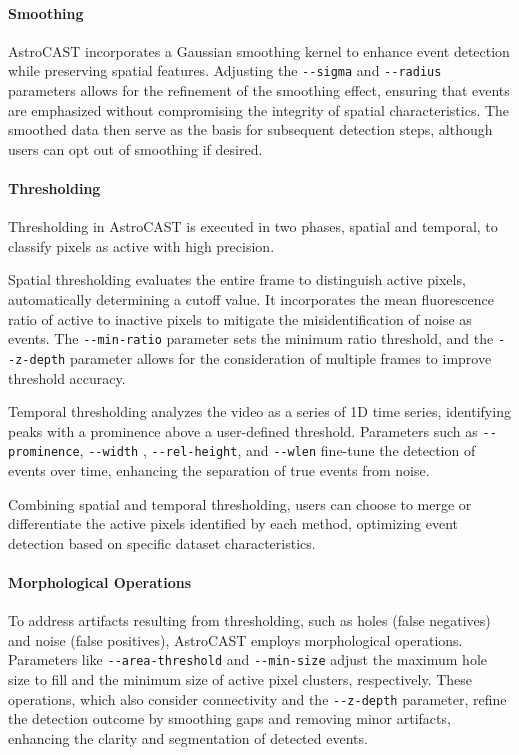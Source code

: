 \paragraph{Smoothing}
AstroCAST incorporates a Gaussian smoothing kernel to enhance event detection while preserving spatial features.
Adjusting the \lstinline[style=bashStyle]{--sigma} and \lstinline[style=bashStyle]{--radius} parameters allows for
the refinement of the smoothing effect, ensuring that events are emphasized without compromising the integrity of
spatial characteristics. The smoothed data then serve as the basis for subsequent detection steps, although users can
opt out of smoothing if desired.

\paragraph{Thresholding}
Thresholding in AstroCAST is executed in two phases, spatial and temporal, to classify pixels as active with high
precision.

Spatial thresholding evaluates the entire frame to distinguish active pixels, automatically determining a cutoff
value. It incorporates the mean fluorescence ratio of active to inactive pixels to mitigate the misidentification of
noise as events. The \lstinline[style=bashStyle]{--min-ratio} parameter sets the minimum ratio threshold, and the \lstinline[style=bashStyle]{--z-depth} parameter allows for the consideration of multiple frames to improve threshold accuracy.

Temporal thresholding analyzes the video as a series of 1D time series, identifying peaks with a prominence above a
user-defined threshold. Parameters such as \lstinline[style=bashStyle]{--prominence}, \lstinline[style=bashStyle]{--width}
, \lstinline[style=bashStyle]{--rel-height}, and \lstinline[style=bashStyle]{--wlen} fine-tune the detection of
events over time, enhancing the separation of true events from noise.

Combining spatial and temporal thresholding, users can choose to merge or differentiate the active pixels identified
by each method, optimizing event detection based on specific dataset characteristics.

\paragraph{Morphological Operations}
To address artifacts resulting from thresholding, such as holes (false negatives) and noise (false positives),
AstroCAST employs morphological operations. Parameters like \lstinline[style=bashStyle]{--area-threshold} and \lstinline[style=bashStyle]{--min-size} adjust the maximum hole size to fill and the minimum size of active pixel clusters, respectively. These operations, which also consider connectivity and the \lstinline[style=bashStyle]{--z-depth} parameter, refine the detection outcome by smoothing gaps and removing minor artifacts, enhancing the clarity and segmentation of detected events.

